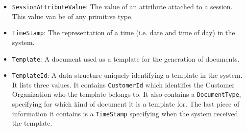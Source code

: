 \documentclass[a4paper,10pt]{article}
\begin{document}
\begin{itemize}
    \item \texttt{SessionAttributeValue}: The value of an attribute attached to a session. This value van be of any primitive type.
    
    \item \texttt{TimeStamp}: The representation of a time (i.e. date and time of day) in the system.
    
    \item \texttt{Template}: A document used as a template for the generation of documents.
    
    \item \texttt{TemplateId}: A data structure uniquely identifying a template in the system. It lists three values. It contains \texttt{CustomerId} which identifies the Customer Organization who the template belongs to. It also contains a \texttt{DocumentType}, specifying for which kind of document it is a template for. The last piece of information it contains is a \texttt{TimeStamp} specifying when the system received the template.
\end{itemize}
\end{document}
